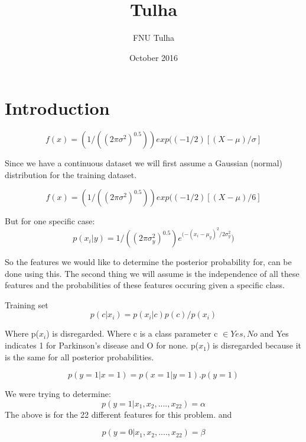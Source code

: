 \documentclass{article}
\title{Tulha}
\author{FNU Tulha }
\date{October 2016}
\begin{document}
\maketitle

\section{Introduction}
\begin{equation}
f(x)= (1/((2\pi \sigma^2)^{0.5}))exp((-1/2)[(X-\mu )/\sigma]
\end{equation}

Since we have a continuous dataset we will first assume a Gaussian (normal) distribution for the training dataset.

\begin{equation}
f(x)= (1/((2\pi \sigma^2)^{0.5}))exp((-1/2)[(X-\mu )/6]    
\end{equation} 

But for one specific case:
\begin{equation}
p(x_{i}|y)=1/((2\pi \sigma_{y}^{2})^{0.5})e^{(-(x_{i}-\mu_{y} )^{2}/2\sigma _{y}^{2}})    
\end{equation}
    


So the features we would like to determine the posterior probability for, can be done using this.
The second thing we will assume is the independence of all these features and the probabilities of these features occuring given a specific class.


Training set
\begin{equation}
p(c|x_{i})=p(x_{i}|c)p(c)/p(x_{i})
\end{equation}

Where p($x_{i}$) is disregarded.
Where c is a class parameter c $\in{Yes, No}$ and Yes indicates 1 for Parkinson's disease and O for none. p($x_{1}$) is disregarded because it is the same for all posterior probabilities.

\begin{equation}
p(y=1|x=1)=p(x=1|y=1).p(y=1)    
\end{equation}

We were trying to determine:
\begin{equation}
p(y=1|x_{1},x_{2},....,x_{22})=\alpha 
\end{equation}
The above is for the 22 different features for this problem.
and

\begin{equation}
p(y=0|x_{1},x_{2},....,x_{22})=\beta
\end{equation}
\end{document}
